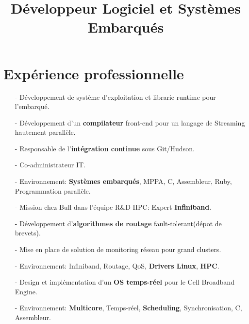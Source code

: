\documentclass[10pt,a4paper]{moderncv}
\title{D\'{e}veloppeur Logiciel et Systèmes \newline{}Embarqu\'{e}s}
\begin{document}
\maketitle
\section{Exp\'{e}rience professionnelle}
{
\begin{itemize}
\item[-]{D\'{e}veloppement de syst\`{e}me d'exploitation et librarie runtime pour l'embarqu\'{e}.}
\item[-]{D\'{e}veloppement d'un \textbf{compilateur} front-end pour un langage de Streaming hautement parall\`{e}le.}
\item[-]{Responsable de l'\textbf{int\'{e}gration continue} sous Git/Hudson.}
\item[-]{Co-administrateur IT.}
\item[-]{Environnement: \textbf{Syst\`{e}mes embarqu\'{e}s}, MPPA, C, Assembleur, Ruby, Programmation parall\`{e}le.}
\end{itemize}
}

{
\begin{itemize}
\item[-]{Mission chez Bull dans l'\'{e}quipe R\&D HPC: Expert \textbf{Infiniband}.}
\item[-]{D\'{e}veloppement d'\textbf{algorithmes de routage} fault-tolerant(d\'{e}pot de brevets).}
\item[-]{Mise en place de solution de monitoring r\'{e}seau pour grand clusters.}
\item[-]{Environnement: Infiniband, Routage, QoS, \textbf{Drivers Linux}, \textbf{HPC}.}
\end{itemize}
}

{
\begin{itemize}
\item[-]{Design et impl\'{e}mentation d'un \textbf{OS temps-r\'{e}el} pour le Cell Broadband Engine.}
\item[-]{Environnement: \textbf{Multicore}, Temps-r\'{e}el, \textbf{Scheduling}, Synchronisation, C, Assembleur.}
\end{itemize}
}
\end{document}
